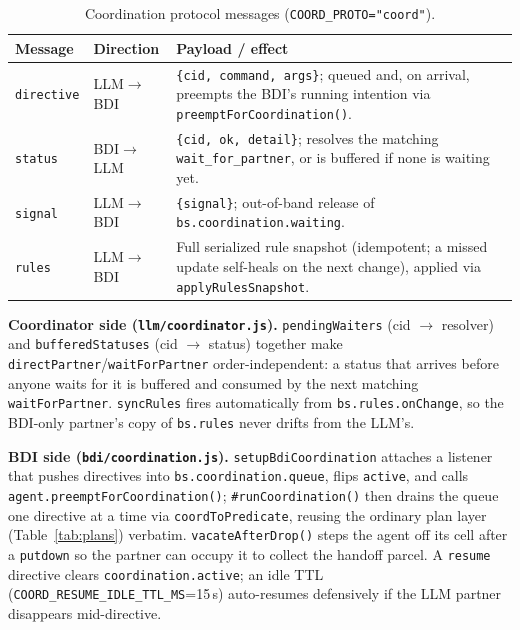 \documentclass[11pt,a4paper]{article}
\renewcommand{\paragraph}[1]{\par\smallskip\noindent\textbf{#1}}
\begin{document}
\begin{table}[htbp]
\centering
\footnotesize
\begin{tabular}{@{}p{2.0cm}p{1.6cm}p{8.7cm}@{}}
\toprule
\textbf{Message} & \textbf{Direction} & \textbf{Payload / effect} \\
\midrule
\texttt{directive} & LLM$\to$BDI & \texttt{\{cid, command, args\}}; queued and, on arrival, preempts the BDI's running intention via \texttt{preemptForCoordination()}. \\
\texttt{status} & BDI$\to$LLM & \texttt{\{cid, ok, detail\}}; resolves the matching \texttt{wait\_for\_partner}, or is buffered if none is waiting yet. \\
\texttt{signal} & LLM$\to$BDI & \texttt{\{signal\}}; out-of-band release of \texttt{bs.coordination.waiting}. \\
\texttt{rules} & LLM$\to$BDI & Full serialized rule snapshot (idempotent; a missed update self-heals on the next change), applied via \texttt{applyRulesSnapshot}. \\
\bottomrule
\end{tabular}
\caption{Coordination protocol messages (\texttt{COORD\_PROTO="coord"}).}
\label{tab:coord-messages}
\end{table}

\paragraph{Coordinator side (\texttt{llm/coordinator.js}).} \texttt{pendingWaiters} (cid
$\to$ resolver) and \texttt{bufferedStatuses} (cid $\to$ status) together make
\texttt{directPartner}/\texttt{waitForPartner} order-independent: a status that arrives before
anyone waits for it is buffered and consumed by the next matching \texttt{waitForPartner}.
\texttt{syncRules} fires automatically from \texttt{bs.rules.onChange}, so the BDI-only partner's
copy of \texttt{bs.rules} never drifts from the LLM's.

\paragraph{BDI side (\texttt{bdi/coordination.js}).} \texttt{setupBdiCoordination} attaches a
listener that pushes directives into \texttt{bs.coordination.queue}, flips \texttt{active}, and
calls \texttt{agent.preemptForCoordination()}; \texttt{\#runCoordination()} then drains the queue
one directive at a time via \texttt{coordToPredicate}, reusing the ordinary plan layer
(Table~\ref{tab:plans}) verbatim. \texttt{vacateAfterDrop()} steps the agent off its cell after a
\texttt{putdown} so the partner can occupy it to collect the handoff parcel. A \texttt{resume}
directive clears \texttt{coordination.active}; an idle TTL
(\texttt{COORD\_RESUME\_IDLE\_TTL\_MS}=15\,s) auto-resumes defensively if the LLM partner
disappears mid-directive.
\end{document}
